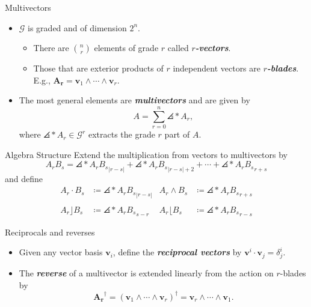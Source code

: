 \documentclass[aspectratio=169,handout]{beamer}
\newcommand\boldgreen[1]{\textcolor{lighter_csu_green}{\emph{\textbf{#1}}}}
\newcommand{\G}{\mathcal{G}}
\newcommand{\blade}[1]{\boldsymbol{#1}}
\DeclarePairedDelimiter\angles{\langle}{\rangle}
\newcommand{\proj}[2]{\angles*{#2}_{#1}}
\begin{document}
\begin{frame}{Multivectors}
\vfill
\begin{itemize}
    \pause
        \item $\G$ is graded and of dimension $2^n$.
    \begin{itemize}
        \pause
        \item There are ${n \choose r}$ elements of grade $r$ called \boldgreen{$r$-vectors}. 
        \pause
        \item Those that are exterior products of $r$ independent vectors are \boldgreen{$r$-blades}. E.g., $\blade{A_r}=\blade{v}_1 \wedge \cdots \wedge\blade{v}_r$.
    \end{itemize}
        \pause
        \item The most general elements are \boldgreen{multivectors} and are given by
        \[
        A = \sum_{r=0}^n \proj{r}{A},
        \]
        where $\proj{r}{A}\in \G^r$ extracts the grade $r$ part of $A$.
\end{itemize}
\vfill
\end{frame}

\begin{frame}{Algebra Structure}
\vfill
Extend the multiplication from vectors to multivectors by
\[
A_r B_s = \proj{|r-s|}{A_r B_s} + \proj{|r-s|+2}{A_r B_s} + \cdots + \proj{r+s}{A_r B_s}
\]
\pause
and define
\begin{align*}
A_r \cdot B_s &\coloneqq \proj{|r-s|}{A_r B_s}  & A_r \wedge B_s &\coloneqq \proj{r+s}{A_r B_s}\\
~\\
A_r \rfloor B_s &\coloneqq \proj{s-r}{A_r B_s}  & A_r \lfloor B_s &\coloneqq \proj{r-s}{A_r B_s}
\end{align*}
\vfill
\end{frame}

\begin{frame}{Reciprocals and reverses}
\vfill
\begin{itemize}
\pause
\item Given any vector basis $\blade{v}_i$, define the \boldgreen{reciprocal vectors} by $\blade{v}^i\cdot \blade{v}_j = \delta^i_j$.
\pause
\item The \boldgreen{reverse} of a multivector is extended linearly from the action on $r$-blades by
\[
\blade{A_r}^\dagger = (\blade{v}_1 \wedge \cdots \wedge\blade{v}_r)^\dagger = \blade{v}_r \wedge \cdots \wedge\blade{v}_1.
\]
\end{itemize}
\vfill
\end{frame}
\end{document}
